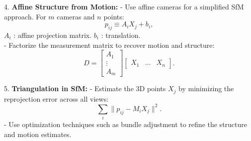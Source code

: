 4. \textbf{Affine Structure from Motion:}
   - Use affine cameras for a simplified SfM approach. For \( m \) cameras and \( n \) points:
     \[
     p_{ij} \equiv A_i X_j + b_i,
     \]
      \( A_i \) : affine projection matrix. \( b_i \) :  translation.\\
   - Factorize the measurement matrix to recover motion and structure:
     \[
     D = \begin{bmatrix} A_1 \\ \vdots \\ A_m \end{bmatrix} \begin{bmatrix} X_1 & \dots & X_n \end{bmatrix}.
     \]

5. \textbf{Triangulation in SfM:}
   - Estimate the 3D points \( X_j \) by minimizing the reprojection error across all views:
     \[
     \sum_i \| p_{ij} - M_i X_j \|^2.
     \]
   - Use optimization techniques such as bundle adjustment to refine the structure and motion estimates.

